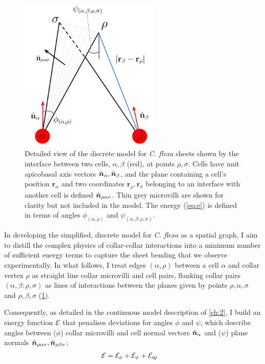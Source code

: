 \begin{figure}[tbhp]
	\centering
	\includegraphics[width=0.6\textwidth]{model.png}
	\caption[Discrete model details]{Detailed view of the discrete model for \textit{C. flexa} sheets shown by the interface between two cells, $\alpha, \beta$ (red), at points $\rho,\sigma$. Cells have unit apicobasal axis vectors $\hat{\bm{n}}_\alpha, \hat{\bm{n}}_\beta$, and the plane containing a cell's position $\bm{r}_\alpha$ and two coordinates $\bm{r}_\rho,\bm{r}_\sigma$ belonging to an interface with another cell is defined $\hat{\bm{n}}_{\rho\alpha\sigma}$. Thin grey microvilli are shown for clarity but not included in the model. The energy (\cref{eq:e}) is defined in terms of angles $\phi_{(\alpha,\rho)}$ and $\psi_{(\alpha,\beta:\rho,\sigma)}$.}
	\label{fig:model_details}
\end{figure}

In developing the simplified, discrete model for \textit{C. flexa} as a spatial graph, I aim to distill the complex physics of collar-collar interactions into a minimum number of sufficient energy terms to capture the sheet bending that we observe experimentally. 
In what follows, I treat edges $(\alpha, \rho)$ between a cell $\alpha$ and collar vertex $\rho$ as straight line collar microvilli and cell pairs, flanking collar pairs $(\alpha, \beta: \rho, \sigma)$ as lines of interactions between the planes given by points $\rho, \alpha, \sigma$ and $\rho, \beta, \sigma$ (\cref{fig:model_details}). 

Consequently, as detailed in the continuous model description of \cref{ch:2}, I build an energy function $\mathcal{E}$ that penalises deviations for angles $\phi$ and $\psi$, which describe angles between ($\phi$) collar microvilli and cell normal vectors $\hat{\bm{n}}_\alpha$ and ($\psi$) plane normals $\hat{\bm{n}}_{\rho\alpha\sigma}, \hat{\bm{n}}_{\rho\beta\sigma}$:
\begin{align}
	\mathcal{E} &= \mathcal{E}_\phi + \mathcal{E}_\psi + \mathcal{E}_{\text{sp}} \label{eq:e}
\end{align}

